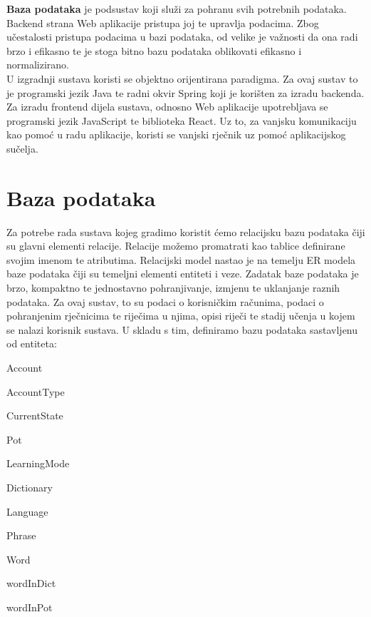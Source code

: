		
		\textbf{Baza podataka} je podsustav koji služi za pohranu svih potrebnih podataka. Backend strana Web aplikacije pristupa joj te upravlja podacima. Zbog učestalosti pristupa podacima u bazi podataka, od velike je važnosti da ona radi brzo i efikasno te je stoga bitno bazu podataka oblikovati efikasno i normalizirano.\\
		
		
		U izgradnji sustava koristi se objektno orijentirana paradigma. Za ovaj sustav to je programski jezik Java te radni okvir Spring koji je korišten za izradu backenda. Za izradu frontend dijela sustava, odnosno Web aplikacije upotrebljava se programski jezik JavaScript te biblioteka React. Uz to, za vanjsku komunikaciju kao pomoć u radu aplikacije, koristi se vanjski rječnik uz pomoć aplikacijskog sučelja.\\

				
		\section{Baza podataka}
			
			
		
\hspace*{6mm} Za potrebe rada sustava kojeg gradimo koristit ćemo relacijsku bazu podataka čiji su glavni elementi relacije. Relacije možemo promatrati kao tablice definirane svojim imenom te atributima. Relacijski model nastao je na temelju ER modela baze podataka čiji su temeljni elementi entiteti i veze. Zadatak baze podataka je brzo, kompaktno te jednostavno pohranjivanje, izmjenu te uklanjanje raznih podataka. Za ovaj sustav, to su podaci o korisničkim računima, podaci o pohranjenim rječnicima te riječima u njima, opisi riječi te stadij učenja u kojem se nalazi korisnik sustava. U skladu s tim, definiramo bazu podataka sastavljenu od entiteta:
			
			\begin{packed_item}
				
				\item Account
				\item AccountType
				\item CurrentState
				\item Pot
				\item LearningMode
				\item Dictionary
				\item Language
				\item Phrase
				\item Word
				\item wordInDict
				\item wordInPot
				
			\end{packed_item}
		

